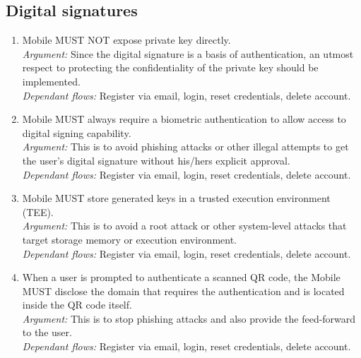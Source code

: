     \subsection{Digital signatures}
        \begin{enumerate}
                \item Mobile MUST NOT expose private key directly.\\
                \textit{Argument:} Since the digital signature is a basis of authentication, an utmost respect to 
                                protecting the confidentiality of the private key should be implemented.\\
                \textit{Dependant flows:} Register via email, login, reset credentials, delete account.

                \item Mobile MUST always require a biometric authentication to allow access to digital signing 
                    capability.\\        
                \textit{Argument:} This is to avoid phishing attacks or other illegal attempts to get the user's 
                                digital signature without his/hers explicit approval.\\
                \textit{Dependant flows:} Register via email, login, reset credentials, delete account.

                \item Mobile MUST store generated keys in a trusted execution environment (TEE).\\        
                \textit{Argument:} This is to avoid a root attack or other system-level attacks that target storage 
                                memory or execution environment.\\
                \textit{Dependant flows:} Register via email, login, reset credentials, delete account.

                \item When a user is prompted to authenticate a scanned QR code, the Mobile MUST disclose the domain that 
                    requires the authentication and is located inside the QR code itself.\\
                \textit{Argument:} This is to stop phishing attacks and also provide the feed-forward to the user.\\
                \textit{Dependant flows:} Register via email, login, reset credentials, delete account.
        \end{enumerate}

